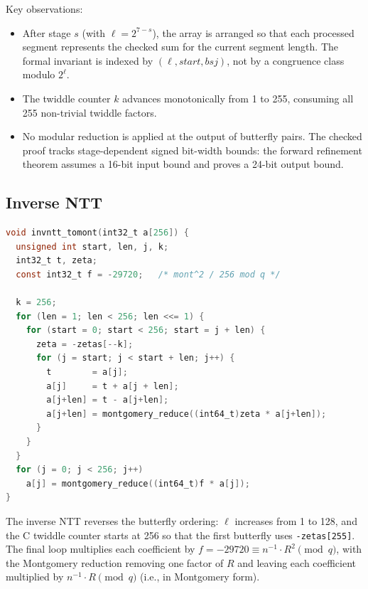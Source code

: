 Key observations:
\begin{itemize}
  \item After stage $s$ (with $\ell = 2^{7-s}$), the array is arranged so
        that each processed segment represents the checked
         sum for the current segment length.  The formal
        invariant is indexed by \((\ell,\mathit{start},\mathit{bsj})\), not
        by a congruence class modulo \(2^\ell\).

  \item The twiddle counter $k$ advances monotonically from 1 to 255,
        consuming all 255 non-trivial twiddle factors.

  \item No modular reduction is applied at the output of butterfly pairs.
        The checked proof tracks stage-dependent signed bit-width bounds:
        the forward refinement theorem assumes a 16-bit input bound and
        proves a 24-bit output bound.
\end{itemize}

\subsection{Inverse NTT}

\begin{lstlisting}[language=C,
  caption={Inverse NTT from \texttt{ntt.c}},
  label={lst:c_invntt}]
void invntt_tomont(int32_t a[256]) {
  unsigned int start, len, j, k;
  int32_t t, zeta;
  const int32_t f = -29720;   /* mont^2 / 256 mod q */

  k = 256;
  for (len = 1; len < 256; len <<= 1) {
    for (start = 0; start < 256; start = j + len) {
      zeta = -zetas[--k];
      for (j = start; j < start + len; j++) {
        t        = a[j];
        a[j]     = t + a[j + len];
        a[j+len] = t - a[j+len];
        a[j+len] = montgomery_reduce((int64_t)zeta * a[j+len]);
      }
    }
  }
  for (j = 0; j < 256; j++)
    a[j] = montgomery_reduce((int64_t)f * a[j]);
}
\end{lstlisting}

The inverse NTT reverses the butterfly ordering: $\ell$ increases from 1 to
128, and the C twiddle counter starts at 256 so that the first butterfly
uses \texttt{-zetas[255]}.  The final loop multiplies each coefficient by
$f = -29720 \equiv n^{-1} \cdot R^2 \pmod{q}$, with the Montgomery reduction
removing one factor of $R$ and leaving each coefficient multiplied by
$n^{-1} \cdot R \pmod{q}$ (i.e., in Montgomery form).

